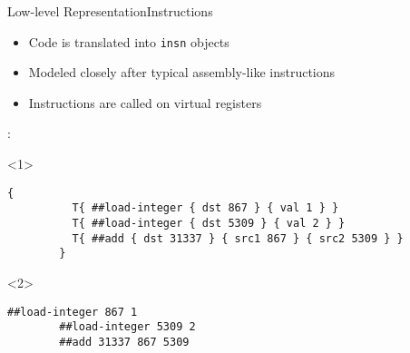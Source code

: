 \documentclass{beamer}
\begin{document}
\begin{frame}[fragile]{Low-level Representation}{Instructions}
  \begin{itemize}
    \item Code is translated into \verb|insn| objects
    \item Modeled closely after typical assembly-like instructions
    \item Instructions are called on \alert{virtual registers}
  \end{itemize}
  \begin{example}
    :
    \begin{onlyenv}<1>
      \begin{Verbatim}[gobble=8]
        {
          T{ ##load-integer { dst 867 } { val 1 } }
          T{ ##load-integer { dst 5309 } { val 2 } }
          T{ ##add { dst 31337 } { src1 867 } { src2 5309 } }
        }
      \end{Verbatim}
    \end{onlyenv}
    \begin{onlyenv}<2>
    \begin{center}
    \begin{minipage}{0.5\textwidth}
      \begin{Verbatim}[frame=single,gobble=8]
        ##load-integer 867 1
        ##load-integer 5309 2
        ##add 31337 867 5309
      \end{Verbatim}
    \end{minipage}
    \end{center}
    \end{onlyenv}
  \end{example}
\end{frame}


\end{document}
